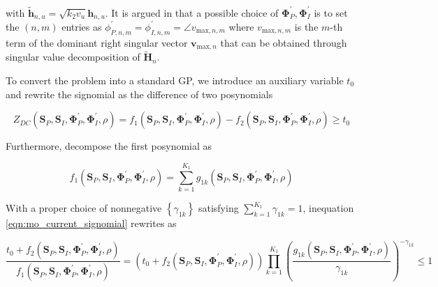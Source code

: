 with ${\widetilde {\mathbf{h}}_{n,u}} = \sqrt {{k_2}{v_u}} {{\mathbf{h}}_{n,u}}$. It is argued in \cite{Clerckx2016} that a possible choice of ${\mathbf{\Phi }}_P^\prime ,{\mathbf{\Phi }}_I^\prime $ is to set the $\left( {n,m} \right)$ entries as $\phi _{P,n,m}^\prime  = \phi _{I,n,m}^\prime  = \angle {v_{{\text{max}},n,m}}$ where ${v_{{\text{max}},n,m}}$ is the $m$-th term of the dominant right singular vector ${{\mathbf{v}}_{{\text{max}},n}}$ that can be obtained through singular value decomposition of ${\widetilde {\mathbf{H}}_n}$.

To convert the problem into a standard GP, we introduce an auxiliary variable ${t_0}$ and rewrite the signomial as the difference of two posynomials

\begin{equation}\label{eqn:mo_current_signomial}
  {Z_{DC}}\left( {{{\mathbf{S}}_P},{{\mathbf{S}}_I},{\mathbf{\Phi }}_P^\prime ,{\mathbf{\Phi }}_I^\prime ,\rho } \right) = {f_1}\left( {{{\mathbf{S}}_P},{{\mathbf{S}}_I},{\mathbf{\Phi }}_P^\prime ,{\mathbf{\Phi }}_I^\prime ,\rho } \right) - {f_2}\left( {{{\mathbf{S}}_P},{{\mathbf{S}}_I},{\mathbf{\Phi }}_P^\prime ,{\mathbf{\Phi }}_I^\prime ,\rho } \right) \geqslant {t_0}
\end{equation}

Furthermore, decompose the first posynomial as

\begin{equation}\label{eqn:mo_current_posynomial}
  {f_1}\left( {{{\mathbf{S}}_P},{{\mathbf{S}}_I},{\mathbf{\Phi }}_P^\prime ,{\mathbf{\Phi }}_I^\prime ,\rho } \right) = \sum\limits_{k = 1}^{{K_1}} {{g_{1k}}} \left( {{{\mathbf{S}}_P},{{\mathbf{S}}_I},{\mathbf{\Phi }}_P^\prime ,{\mathbf{\Phi }}_I^\prime ,\rho } \right)
\end{equation}

With a proper choice of nonnegative $\left\{ {{\gamma _{1k}}} \right\}$ satisfying $\sum\nolimits_{k = 1}^{{K_1}} {{\gamma _{1k}}}  = 1$, inequation \ref{eqn:mo_current_signomial} rewrites as

\begin{equation}\label{eqn:mo_current_signomial_rewritten}
  \frac{{{t_0} + {f_2}\left( {{{\mathbf{S}}_P},{{\mathbf{S}}_I},{\mathbf{\Phi }}_P^\prime ,{\mathbf{\Phi }}_I^\prime ,\rho } \right)}}{{{f_1}\left( {{{\mathbf{S}}_P},{{\mathbf{S}}_I},{\mathbf{\Phi }}_P^\prime ,{\mathbf{\Phi }}_I^\prime ,\rho } \right)}} = \left( {{t_0} + {f_2}\left( {{{\mathbf{S}}_P},{{\mathbf{S}}_I},{\mathbf{\Phi }}_P^\prime ,{\mathbf{\Phi }}_I^\prime ,\rho } \right)} \right)\prod\limits_{k = 1}^{{K_1}} {{{\left( {\frac{{{g_{1k}}\left( {{{\mathbf{S}}_P},{{\mathbf{S}}_I},{\mathbf{\Phi }}_P^\prime ,{\mathbf{\Phi }}_I^\prime ,\rho } \right)}}{{{\gamma _{1k}}}}} \right)}^{ - {\gamma _{1k}}}}}  \leqslant 1
\end{equation}


